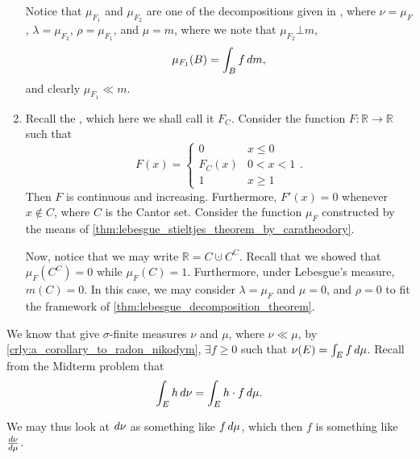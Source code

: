 \documentclass[notoc,notitlepage]{tufte-book}
\begin{document}
\begin{eg}
\begin{enumerate}
      Notice that $\mu_{F_1}$ and $\mu_{F_2}$ are one of the decompositions
      given in ,
      where $\nu = \mu_F$, $\lambda = \mu_{F_2}$, $\rho = \mu_{F_1}$, and $\mu = m$,
      where we note that $\mu_{F_2} \bot m$,
      \begin{equation*}
        \mu_{F_1}(B) = \int_{B} f \mathop{}\!d{m},
      \end{equation*}
      and clearly $\mu_{F_1} \ll m$.

    \item Recall the , which here we shall call it
      $F_C$.
      Consider the function $F : \mathbb{R} \to \mathbb{R}$ such that
      \begin{equation*}
        F(x) = \begin{cases}
          0 & x \leq 0 \\
          F_C(x) & 0 < x < 1 \\
          1 & x \geq 1
        \end{cases}.
      \end{equation*}
      Then $F$ is continuous and increasing.
      Furthermore, $F'(x) = 0$ whenever $x \notin C$, where $C$ is the Cantor set.
      Consider the function $\mu_F$ constructed by the means of
      \cref{thm:lebesgue_stieltjes_theorem_by_caratheodory}.

      Now, notice that we may write $\mathbb{R} = C \cupdot C^C$.
      Recall that we showed that $\mu_F(C^C) = 0$ while $\mu_{F}(C) = 1$.
      Furthermore, under Lebesgue's measure, $m(C) = 0$.
      In this case, we may consider $\lambda = \mu_F$ and $\mu = 0$,
      and $\rho = 0$ to fit the framework of
      \cref{thm:lebesgue_decomposition_theorem}.
  \end{enumerate}
\end{eg}

\begin{note}
  We know that give $\sigma$-finite measures $\nu$ and $\mu$,
  where $\nu \ll \mu$, by \cref{crly:a_corollary_to_radon_nikodym},
  $\exists f \geq 0$ such that $\nu(E) = \int_{E} f \mathop{}\!d{\mu}$.
  Recall from the Midterm problem that
  \begin{equation*}
    \int_{E} h \mathop{}\!d{\nu} = \int_{E} h \cdot f \mathop{}\!d{\mu}.
  \end{equation*}

  We may thus look at $\mathop{}\!d{\nu}$ as something like $f \mathop{}\!d{\mu}$,
  which then $f$ is something like $\frac{\mathop{}\!d{\nu}}{\mathop{}\!d{\mu}}$.
\end{note}
\end{document}
